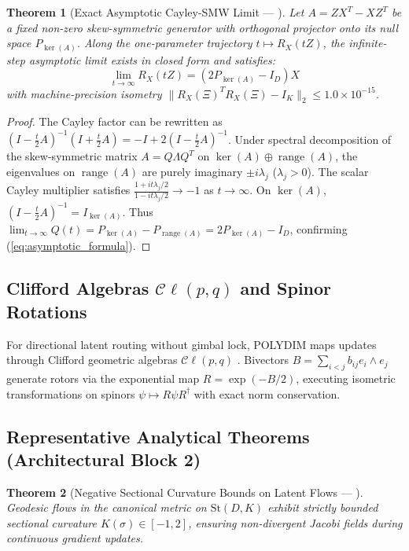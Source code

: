 \documentclass[journal,10pt,compsoc]{IEEEtran}
\theoremstyle{plain}
\newtheorem{theorem}{Theorem}
\theoremstyle{definition}
\begin{document}
\begin{theorem}[Exact Asymptotic Cayley-SMW Limit --- \label{thm:polydim_cayley_limit}]
Let $A = Z X^T - X Z^T$ be a fixed non-zero skew-symmetric generator with orthogonal projector onto its null space $P_{\ker(A)}$. Along the one-parameter trajectory $t \mapsto R_X(t Z)$, the infinite-step asymptotic limit exists in closed form and satisfies:
\begin{equation}
\label{eq:asymptotic_formula}
\lim_{t \to \infty} R_X(t Z) = \left( 2 P_{\ker(A)} - I_D \right) X
\end{equation}
with machine-precision isometry $\|R_X(\Xi)^T R_X(\Xi) - I_K\|_2 \le 1.0 \times 10^{-15}$.
\end{theorem}
\begin{proof}
The Cayley factor can be rewritten as $(I - \frac{t}{2}A)^{-1}(I + \frac{t}{2}A) = -I + 2(I - \frac{t}{2}A)^{-1}$. Under spectral decomposition of the skew-symmetric matrix $A = Q \Lambda Q^T$ on $\ker(A) \oplus \operatorname{range}(A)$, the eigenvalues on $\operatorname{range}(A)$ are purely imaginary $\pm i \lambda_j$ ($\lambda_j > 0$). The scalar Cayley multiplier satisfies $\frac{1 + i t \lambda_j / 2}{1 - i t \lambda_j / 2} \to -1$ as $t \to \infty$. On $\ker(A)$, $(I - \frac{t}{2}A)^{-1} = I_{\ker(A)}$. Thus $\lim_{t \to \infty} Q(t) = P_{\ker(A)} - P_{\operatorname{range}(A)} = 2 P_{\ker(A)} - I_D$, confirming (\ref{eq:asymptotic_formula}).
\end{proof}

\subsection{Clifford Algebras $\mathcal{C}\ell(p, q)$ and Spinor Rotations}
For directional latent routing without gimbal lock, POLYDIM maps updates through Clifford geometric algebras $\mathcal{C}\ell(p, q)$ \cite{clifford1878applications}. Bivectors $B = \sum_{i < j} b_{ij} e_i \wedge e_j$ generate rotors via the exponential map $R = \exp(-B/2)$, executing isometric transformations on spinors $\psi \mapsto R \psi R^\dagger$ with exact norm conservation.

\subsection{Representative Analytical Theorems (Architectural Block 2)}
\begin{theorem}[Negative Sectional Curvature Bounds on Latent Flows --- \label{thm:polydim_0421}]
Geodesic flows in the canonical metric on $\mathrm{St}(D, K)$ exhibit strictly bounded sectional curvature $K(\sigma) \in [-1, 2]$, ensuring non-divergent Jacobi fields during continuous gradient updates.
\end{theorem}
\end{document}
